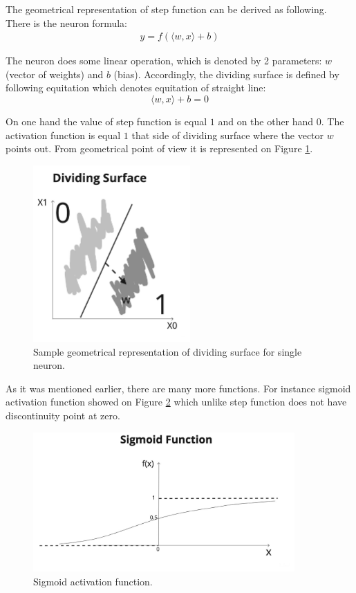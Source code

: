 The geometrical representation of step function can be derived as following. There is the neuron formula:
\begin{align*}
y = f(\langle w, x \rangle + b)
\end{align*}

The neuron does some linear operation, which is denoted by 2 parameters: $w$ (vector of weights) and $b$ (bias).
Accordingly, the dividing surface is defined by following equitation which denotes equitation of straight line:
\[\langle w, x \rangle + b = 0\]

On one hand the value of step function is equal $1$ and on the other hand $0$. The activation function is equal $1$ that side of dividing surface where the vector $w$ points out. From geometrical point of view it is represented on Figure \ref{fig:dividing_surface}.  

\begin{figure}[h]
    \centering \includegraphics[width=6cm]{images/dividing_surface.jpeg}
    \caption {Sample geometrical representation of dividing surface for single neuron.}
    \label{fig:dividing_surface}
\end{figure}

As it was mentioned earlier, there are many more functions. For instance sigmoid activation function showed on Figure \ref{fig:sigmoid} which unlike step function does not have discontinuity point at zero. 

\begin{figure}[h]
    \centering \includegraphics[width=10cm]{images/sigmoid_function.jpeg}
    \caption {Sigmoid activation function.}
    \label{fig:sigmoid}
\end{figure}

